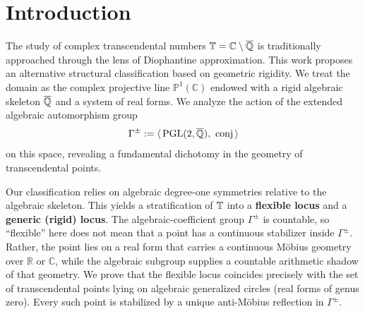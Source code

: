 \begin{abstract}
	We propose a structural classification of complex transcendental numbers based on the geometric rigidity of their minimal algebraic locus in $\mathbb{P}^1(\mathbb{C})$. By analyzing the action of the extended algebraic degree-one group $\Gamma^{\pm}=\langle \PGL(2,\Alg),\,\mathrm{conj}\rangle$, we establish a dichotomy between \emph{flexible} and \emph{rigid} geometries.
	The \emph{flexible locus} consists of transcendental points admitting a non-trivial algebraic degree-one symmetry; we prove this locus coincides precisely with the set of transcendental points on algebraic generalized circles (real forms of genus zero). While these curves are geometrically rigid under intersection, the dynamics upon them are chaotic: the orbit equivalence relation is shown to be meagre, non-smooth, and admitting perfect antichains.
	In contrast, the \emph{generic locus} is characterized by geometric rigidity and trivial stabilizers. This includes the \emph{independence locus} (points of transcendence degree 2), which is topologically generic (comeagre) and measure-theoretically dominant. We prove that the group action on this locus is topologically transitive (dense orbits).
	Finally, we establish a maximality theorem characterizing $\Gamma^{\pm}$ as the unique maximal degree-one transfer semigroup compatible with the algebraic structure of $\mathbb{P}^1$, identifying it as a natural boundary for this particular notion of algebraic symmetry.
\end{abstract}


\section{Introduction}\label{grct:sec:introduction}
The study of complex transcendental numbers $\mathbb{T} = \mathbb{C} \setminus \overline{\mathbb{Q}}$ is traditionally approached through the lens of Diophantine approximation. This work proposes an alternative structural classification based on geometric rigidity. We treat the domain as the complex projective line $\mathbb{P}^1(\mathbb{C})$ endowed with a rigid algebraic skeleton $\overline{\mathbb{Q}}$ and a system of real forms. We analyze the action of the extended algebraic automorphism group
\[
	\Gamma^{\pm}:=\langle\,\PGL(2,\Alg),\ \J\,\rangle
\]
on this space, revealing a fundamental dichotomy in the geometry of transcendental points.

Our classification relies on algebraic degree-one symmetries relative to the algebraic skeleton. This yields a stratification of $\mathbb{T}$ into a \textbf{flexible locus} and a \textbf{generic (rigid) locus}. The algebraic-coefficient group $\Gamma^{\pm}$ is countable, so ``flexible'' here does not mean that a point has a continuous stabilizer inside $\Gamma^{\pm}$. Rather, the point lies on a real form that carries a continuous Möbius geometry over $\mathbb{R}$ or $\mathbb{C}$, while the algebraic subgroup supplies a countable arithmetic shadow of that geometry. We prove that the flexible locus coincides precisely with the set of transcendental points lying on algebraic generalized circles (real forms of genus zero). Every such point is stabilized by a unique anti-Möbius reflection in $\Gamma^{\pm}$.

